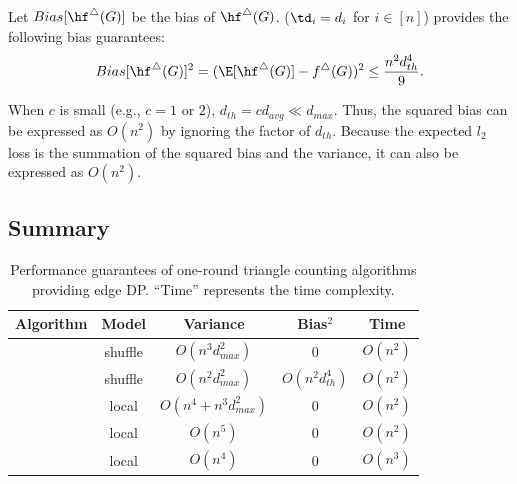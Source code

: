 \begin{theorem}
\label{thm:bias_II_ast}
Let $Bias[\hf^\triangle(G)]$ be the bias of $\hf^\triangle(G)$. 
\AlgWSTriVR{} ($\td_i = d_i$ for $i\in[n]$) 
provides the following bias guarantees:
\begin{align}
    Bias[\hf^\triangle(G)]^2 
    = (\E[\hf^\triangle(G)] - f^\triangle(G))^2 
    \leq \frac{n^2 d_{th}^4}{9}. 
    \label{eq:thm:bias_II_ast}
\end{align}
\end{theorem}

When $c$ is small (e.g., $c=1$ or $2$), $d_{th} = c d_{avg} \ll d_{max}$. 
Thus, the squared bias can be expressed as $O(n^2)$ by ignoring the factor of $d_{th}$. 
Because the expected $l_2$ loss is the summation of the squared bias and the variance, it can also be expressed as $O(n^2)$. 

\subsection{Summary}
\label{sub:summary}


\begin{table}[t]
  \centering
  \begin{tabular}{|l|c|c|c|c|}
    \hline
    Algorithm & Model & Variance & Bias$^2$ & Time \\ \hline
    \AlgWSTri{} & shuffle & $O(n^3 d_{max}^2)$ & $0$ & $O(n^2)$ \\ \hline
    \AlgWSTriVR{}{} & shuffle & $O(n^2 d_{max}^2)$ & $O(n^2 d_{th}^4)$ & $O(n^2)$ \\ \hline
    \AlgWLTri{} \cite{Imola_USENIX22} & local & $O(n^4 + n^3 d_{max}^2)$ & $0$ & $O(n^2)$ \\ \hline
    \AlgARRTri{} \cite{Imola_USENIX22} & local & $O(n^5)$ & $0$ & $O(n^2)$ \\ \hline
    \AlgRRTri{} \cite{Imola_USENIX21} & local & $O(n^4)$ & $0$ & $O(n^3)$ \\ \hline
  \end{tabular}
  \caption{Performance guarantees of one-round triangle counting algorithms providing edge DP. 
  ``Time'' represents the time complexity. 
  }
  \label{tab:upper_bounds}
\end{table}

